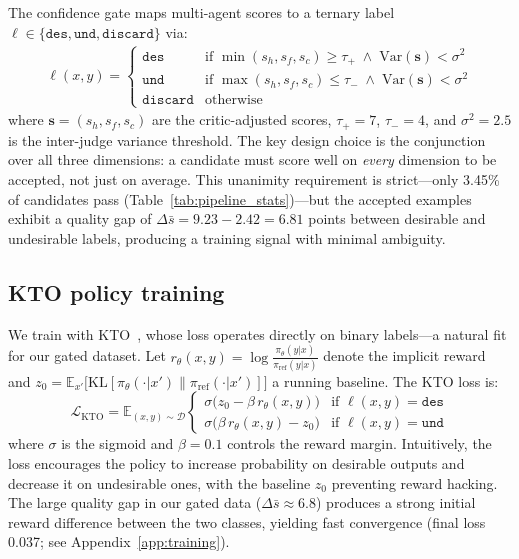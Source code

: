 \documentclass{article}
\begin{document}
The confidence gate maps multi-agent scores to a ternary label $\ell \in \{\texttt{des}, \texttt{und}, \texttt{discard}\}$ via:
\begin{align}
\ell(x,y) = \begin{cases}
\texttt{des}  & \text{if } \min(s_h, s_f, s_c) \geq \tau_+ \;\wedge\; \text{Var}(\mathbf{s}) < \sigma^2 \\
\texttt{und}  & \text{if } \max(s_h, s_f, s_c) \leq \tau_- \;\wedge\; \text{Var}(\mathbf{s}) < \sigma^2 \\
\texttt{discard} & \text{otherwise}
\end{cases}
\label{eq:gate}
\end{align}
where $\mathbf{s} = (s_h, s_f, s_c)$ are the critic-adjusted scores, $\tau_+{=}7$, $\tau_-{=}4$, and $\sigma^2{=}2.5$ is the inter-judge variance threshold. The key design choice is the conjunction over all three dimensions: a candidate must score well on \emph{every} dimension to be accepted, not just on average. This unanimity requirement is strict---only 3.45\% of candidates pass (Table~\ref{tab:pipeline_stats})---but the accepted examples exhibit a quality gap of $\Delta\bar{s} = 9.23 - 2.42 = 6.81$ points between desirable and undesirable labels, producing a training signal with minimal ambiguity.

\subsection{KTO policy training}

We train with KTO~\citep{ethayarajh2024kto}, whose loss operates directly on binary labels---a natural fit for our gated dataset. Let $r_\theta(x,y) = \log \frac{\pi_\theta(y|x)}{\pi_{\text{ref}}(y|x)}$ denote the implicit reward and $z_0 = \mathbb{E}_{x'}\bigl[\text{KL}[\pi_\theta(\cdot|x') \| \pi_{\text{ref}}(\cdot|x')]\bigr]$ a running baseline. The KTO loss is:
\begin{equation}
\mathcal{L}_{\text{KTO}} = \mathbb{E}_{(x,y)\sim\mathcal{D}} \begin{cases}
\sigma\bigl(z_0 - \beta\, r_\theta(x,y)\bigr) & \text{if } \ell(x,y) = \texttt{des} \\
\sigma\bigl(\beta\, r_\theta(x,y) - z_0\bigr) & \text{if } \ell(x,y) = \texttt{und}
\end{cases}
\label{eq:kto}
\end{equation}
where $\sigma$ is the sigmoid and $\beta{=}0.1$ controls the reward margin. Intuitively, the loss encourages the policy to increase probability on desirable outputs and decrease it on undesirable ones, with the baseline $z_0$ preventing reward hacking. The large quality gap in our gated data ($\Delta\bar{s} \approx 6.8$) produces a strong initial reward difference between the two classes, yielding fast convergence (final loss 0.037; see Appendix~\ref{app:training}).
\end{document}
